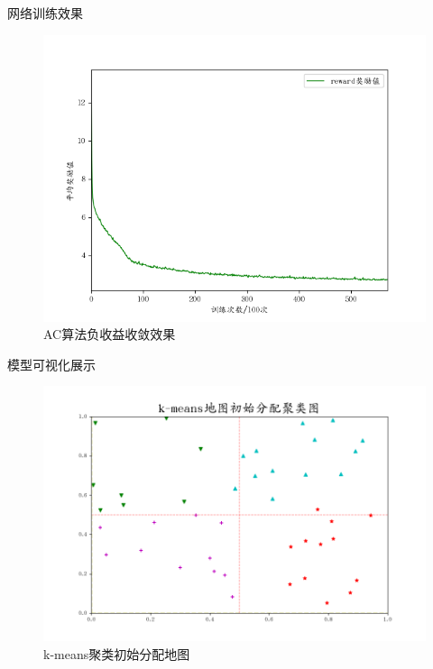 \documentclass{beamer}
\begin{document}
\begin{frame}{网络训练效果}

    \begin{figure}[htbp]
		  \centering
            \includegraphics[scale=0.4]{pic/reward.png}
            
            \caption{AC算法负收益收敛效果}
    \end{figure}
\end{frame}

\begin{frame}{模型可视化展示}

    \begin{figure}[htbp]
		  \centering
            \includegraphics[scale=0.4]{pic/test1.png}
            
            \caption{k-means聚类初始分配地图}
    \end{figure}
\end{frame}
\end{document}
